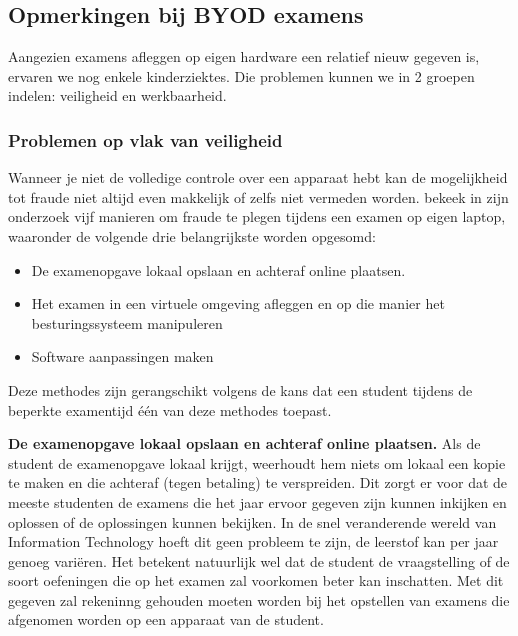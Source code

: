 \subsection{Opmerkingen bij BYOD examens}

Aangezien examens afleggen op eigen hardware een relatief nieuw gegeven is, ervaren we nog enkele kinderziektes. Die problemen kunnen we in 2 groepen indelen: veiligheid en werkbaarheid.\\ 

\subsubsection{Problemen op vlak van veiligheid}
Wanneer je niet de volledige controle over een apparaat hebt kan de mogelijkheid tot fraude niet altijd even makkelijk of zelfs niet vermeden worden.
\textcite{Dawson2016} bekeek in zijn onderzoek vijf manieren om fraude te plegen tijdens een examen op eigen laptop, waaronder de volgende drie belangrijkste worden opgesomd: 
\begin{itemize}
	\item De examenopgave lokaal opslaan en achteraf online plaatsen.
	\item Het examen in een virtuele omgeving afleggen en op die manier het besturingssysteem manipuleren
	\item Software aanpassingen maken 

\end{itemize}

Deze methodes zijn gerangschikt volgens de kans dat een student tijdens de beperkte examentijd \'{e}\'{e}n van deze methodes toepast.  

\textbf{De examenopgave lokaal opslaan en achteraf online plaatsen.} Als de student de examenopgave lokaal krijgt, weerhoudt hem niets om lokaal een kopie te maken en die achteraf (tegen betaling) te verspreiden. Dit zorgt er voor dat de meeste studenten de examens die het jaar ervoor gegeven zijn kunnen inkijken en oplossen of de oplossingen kunnen bekijken. In de snel veranderende wereld van Information Technology hoeft dit geen probleem te zijn, de leerstof kan per jaar genoeg vari\"{e}ren. Het betekent natuurlijk wel dat de student de vraagstelling of de soort oefeningen die op het examen zal voorkomen beter kan inschatten. Met dit gegeven zal rekeninng gehouden moeten worden bij het opstellen van examens die afgenomen worden op een apparaat van de student. 

